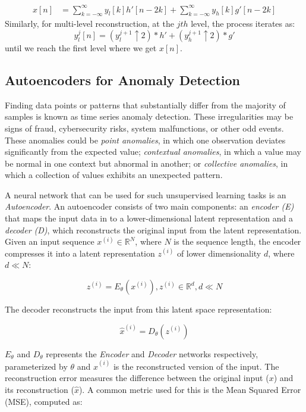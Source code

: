 \begin{align} 
\label{eq:idwt}
x[n] &= \sum_{k=-\infty}^{\infty} y_l[k] h'[n - 2k] + \sum_{k=-\infty}^{\infty} y_h[k] g'[n - 2k] 
\end{align}
Similarly, for multi-level reconstruction, at the $jth$ level, the process iterates as:
\begin{equation} 
y_l^j[n] = (y_l^{j+1} \uparrow 2) \ast h' + (y_h^{j+1} \uparrow 2) \ast g' 
\end{equation} until we reach the first level where we get $x[n]$. 
 
\subsection{Autoencoders for Anomaly Detection}
Finding data points or patterns that substantially differ from the majority of
samples is known as time series anomaly detection. These irregularities may be
signs of fraud, cybersecurity risks, system malfunctions, or other odd
events. These anomalies could be \emph{point anomalies}, in which one
observation deviates significantly from the expected value; \emph{contextual
anomalies}, in which a value may be normal in one context but abnormal in
another; or \emph{collective anomalies}, in which a collection of values
exhibits an unexpected pattern. 

A neural network that can be used for such unsupervised learning tasks is an {\em Autoencoder}. An autoencoder consists
of two main components: an {\em encoder (E)} that maps the input data in to a lower-dimensional latent representation
and a {\em decoder (D)}, which reconstructs the original input from the latent representation.  Given an input sequence
\( x^{(i)} \in \mathbb{R}^N\), where \( N \) is the sequence length, the encoder compresses it into a latent
representation \( z^{(i)} \) of lower dimensionality \( d \), where \( d \ll N \):

\begin{equation}
    z^{(i)} = E_\theta(x^{(i)}), z^{(i)} \in \mathbb{R}^d, d \ll N
    \label{eq:enc}
\end{equation}

The decoder reconstructs the input from this latent space representation:

\begin{equation}
    \hat{x}^{(i)} = D_\theta(z^{(i)})
    \label{eq:dec}
\end{equation}

$E_{\theta}$ and $D_\theta$ represents the {\em Encoder} and {\em Decoder}
networks respectively, parameterized by $\theta$ and \( \hat{x}^{(i)} \) is the reconstructed
version of the input. The reconstruction error measures the difference between
the original input ($x$) and its reconstruction ($\hat{x}$). A common metric
used for this is the Mean Squared Error (MSE), computed as:

